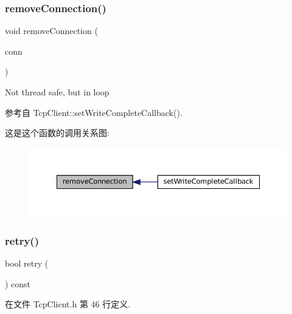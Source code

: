 \subsubsection{\texorpdfstring{remove\+Connection()}{removeConnection()}}
{\footnotesize\ttfamily void remove\+Connection (\begin{DoxyParamCaption}\item[{const \hyperlink{namespacemuduo_1_1net_ab91a46e9290926aa692450e46cfc9039}{Tcp\+Connection\+Ptr} \&}]{conn }\end{DoxyParamCaption})\hspace{0.3cm}{\ttfamily [private]}}



Not thread safe, but in loop 



参考自 Tcp\+Client\+::set\+Write\+Complete\+Callback().

这是这个函数的调用关系图\+:
\nopagebreak
\begin{figure}[H]
\begin{center}
\leavevmode
\includegraphics[width=350pt]{classmuduo_1_1net_1_1TcpClient_ad9661c3f05443256c9439f812d1a7691_icgraph}
\end{center}
\end{figure}
\mbox{\label{classmuduo_1_1net_1_1TcpClient_aed2da3d81e2ab3b35cce19615d9434a7}} 
\subsubsection{\texorpdfstring{retry()}{retry()}}
{\footnotesize\ttfamily bool retry (\begin{DoxyParamCaption}{ }\end{DoxyParamCaption}) const\hspace{0.3cm}{\ttfamily [inline]}}



在文件 Tcp\+Client.\+h 第 46 行定义.



